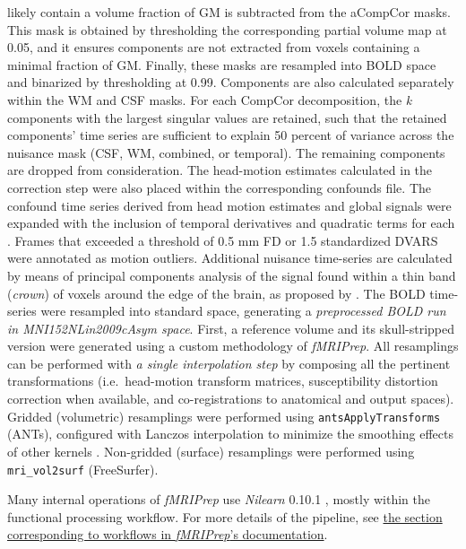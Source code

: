 \documentclass[fleqn,10pt]{wlscirep}
\begin{document}
likely contain a volume fraction of GM is subtracted from the aCompCor
masks. This mask is obtained by thresholding the corresponding partial
volume map at 0.05, and it ensures components are not extracted from
voxels containing a minimal fraction of GM. Finally, these masks are
resampled into BOLD space and binarized by thresholding at 0.99. Components are also calculated separately
within the WM and CSF masks. For each CompCor decomposition, the
\emph{k} components with the largest singular values are retained, such
that the retained components' time series are sufficient to explain 50
percent of variance across the nuisance mask (CSF, WM, combined, or
temporal). The remaining components are dropped from consideration. The
head-motion estimates calculated in the correction step were also placed
within the corresponding confounds file. The confound time series
derived from head motion estimates and global signals were expanded with
the inclusion of temporal derivatives and quadratic terms for each
\citep{satterthwaite_2013}. Frames that exceeded a threshold
of 0.5 mm FD or 1.5 standardized DVARS were annotated as motion
outliers. Additional nuisance time-series are calculated by means of
principal components analysis of the signal found within a thin band
(\emph{crown}) of voxels around the edge of the brain, as proposed by
\citep{patriat_improved_2017}. The BOLD time-series were resampled into
standard space, generating a \emph{preprocessed BOLD run in
MNI152NLin2009cAsym space}. First, a reference volume and its
skull-stripped version were generated using a custom methodology of
\emph{fMRIPrep}. All resamplings can be performed with \emph{a single
interpolation step} by composing all the pertinent transformations
(i.e.~head-motion transform matrices, susceptibility distortion
correction when available, and co-registrations to anatomical and output
spaces). Gridded (volumetric) resamplings were performed using
\texttt{antsApplyTransforms} (ANTs), configured with Lanczos
interpolation to minimize the smoothing effects of other kernels
\citep{lanczos}. Non-gridded (surface) resamplings were performed using
\texttt{mri\_vol2surf} (FreeSurfer).

Many internal operations of \emph{fMRIPrep} use \emph{Nilearn} 0.10.1
\citep[RRID:SCR\_001362]{abraham2014machine}, mostly within the functional
processing workflow. For more details of the pipeline, see
\href{https://fmriprep.readthedocs.io/en/latest/workflows.html}{the
section corresponding to workflows in \emph{fMRIPrep}'s documentation}.
\end{document}
